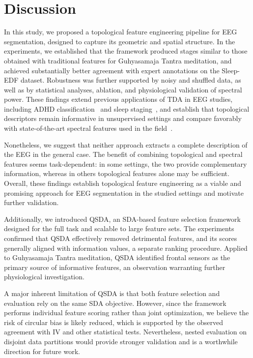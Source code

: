 \documentclass[pdflatex,sn-basic,Numbered]{sn-jnl}
\begin{document}
\section{Discussion}

In this study, we proposed a topological feature engineering pipeline for EEG segmentation, designed to capture its geometric and spatial structure. In the experiments, we established that the framework produced stages similar to those obtained with traditional features for Guhyasamaja Tantra meditation, and achieved substantially better agreement with expert annotations on the Sleep-EDF dataset. Robustness was further supported by noisy and shuffled data, as well as by statistical analyses, ablation, and physiological validation of spectral power. These findings extend previous applications of TDA in EEG studies, including ADHD classification~\cite{cai2024topologicalfeaturesearchmethod} and sleep staging~\cite{deng2024twostagehierarchicalexplainablefeature}, and establish that topological descriptors remain informative in unsupervised settings and compare favorably with state-of-the-art spectral features used in the field~\cite{SDA}.

Nonetheless, we suggest that neither approach extracts a complete description of the EEG in the general case. The benefit of combining topological and spectral features seems task-dependent: in some settings, the two provide complementary information, whereas in others topological features alone may be sufficient. Overall, these findings establish topological feature engineering as a viable and promising approach for EEG segmentation in the studied settings and motivate further validation.

Additionally, we introduced QSDA, an SDA-based feature selection framework designed for the full task and scalable to large feature sets. The experiments confirmed that QSDA effectively removed detrimental features, and its scores generally aligned with information values, a separate ranking procedure. Applied to Guhyasamaja Tantra meditation, QSDA identified frontal sensors as the primary source of informative features, an observation warranting further physiological investigation.

A major inherent limitation of QSDA is that both feature selection and evaluation rely on the same SDA objective. However, since the framework performs individual feature scoring rather than joint optimization, we believe the risk of circular bias is likely reduced, which is supported by the observed agreement with IV and other statistical tests. Nevertheless, nested evaluation on disjoint data partitions would provide stronger validation and is a worthwhile direction for future work.
\end{document}
